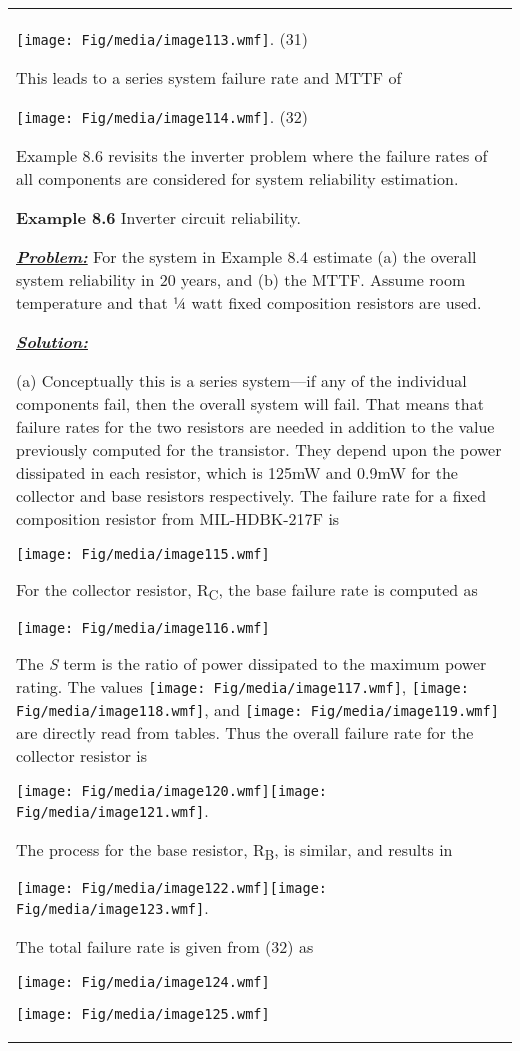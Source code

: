 \begin{table}
\begin{tabular}{m{15cm}|}
\texttt{[image: Fig/media/image113.wmf]}. (31)

This leads to a series system failure rate and MTTF of

\texttt{[image: Fig/media/image114.wmf]}. (32)

Example 8.6 revisits the inverter problem where the failure rates of all
components are considered for system reliability estimation.

\textbf{\hfill\break
Example 8.6} Inverter circuit reliability.

\emph{\textbf{\ul{Problem:}}} For the system in Example 8.4 estimate (a)
the overall system reliability in 20 years, and (b) the MTTF. Assume
room temperature and that ¼ watt fixed composition resistors are used.

\emph{\textbf{\ul{Solution:}}}

(a) Conceptually this is a series system---if any of the individual
components fail, then the overall system will fail. That means that
failure rates for the two resistors are needed in addition to the value
previously computed for the transistor. They depend upon the power
dissipated in each resistor, which is 125mW and 0.9mW for the collector
and base resistors respectively. The failure rate for a fixed
composition resistor from MIL-HDBK-217F is

\texttt{[image: Fig/media/image115.wmf]}

For the collector resistor, R\textsubscript{C}, the base failure rate is
computed as

\texttt{[image: Fig/media/image116.wmf]}

The \emph{S} term is the ratio of power dissipated to the maximum power
rating. The values \texttt{[image: Fig/media/image117.wmf]},
\texttt{[image: Fig/media/image118.wmf]}, and
\texttt{[image: Fig/media/image119.wmf]} are directly read from tables.
Thus the overall failure rate for the collector resistor is

\texttt{[image: Fig/media/image120.wmf]}\texttt{[image: Fig/media/image121.wmf]}.

The process for the base resistor, R\textsubscript{B}, is similar, and
results in

\texttt{[image: Fig/media/image122.wmf]}\texttt{[image: Fig/media/image123.wmf]}.

The total failure rate is given from (32) as

\texttt{[image: Fig/media/image124.wmf]}

\texttt{[image: Fig/media/image125.wmf]}


\end{tabular}
\end{table}
